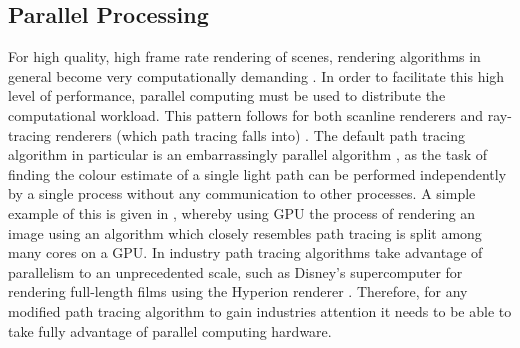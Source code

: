 \documentclass[../dissertation.tex]{subfiles}
\begin{document}
\subsection{Parallel Processing}

For high quality, high frame rate rendering of scenes, rendering algorithms in general become very computationally demanding \cite{crockett1995parallel}. In order to facilitate this high level of performance, parallel computing must be used to distribute the computational workload. This pattern follows for both scanline renderers and ray-tracing renderers (which path tracing falls into) \cite{alerstam2008parallel, fatahalian2009data}. The default path tracing algorithm in particular is an embarrassingly parallel algorithm \cite{embarissingly_parallelizable}, as the task of finding the colour estimate of a single light path can be performed independently by a single process without any communication to other processes. A simple example of this is given in \cite{accelerated_ray_tracing}, whereby using GPU the process of rendering an image using an algorithm which closely resembles path tracing is split among many cores on a GPU. In industry path tracing algorithms take advantage of parallelism to an unprecedented scale, such as Disney's supercomputer for rendering full-length films using the Hyperion renderer \cite{hyperion}. Therefore, for any modified path tracing algorithm to gain industries attention it needs to be able to take fully advantage of parallel computing hardware.\\
\end{document}

